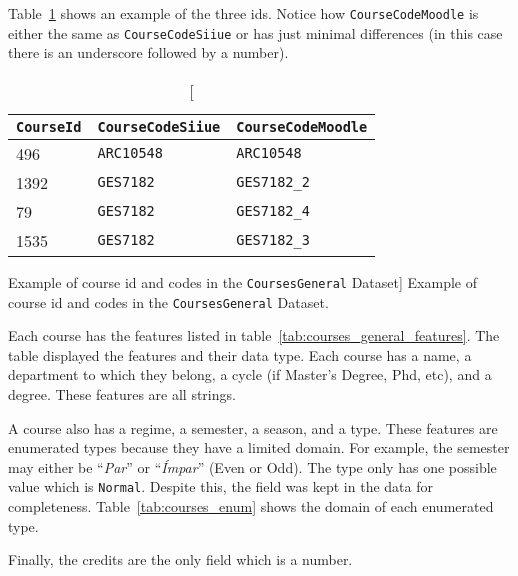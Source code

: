 Table~\ref{tab:course_code_example} shows an example of the three ids. Notice
how \texttt{CourseCodeMoodle} is either the same as \texttt{CourseCodeSiiue} or
has just minimal differences (in this case there is an underscore followed by a
number).

\begin{table}[h!]
    \centering

    \begin{tabular}{l l l}
\texttt{CourseId} & \texttt{CourseCodeSiiue} & \texttt{CourseCodeMoodle} \\ \hline
        496       & \texttt{ARC10548}        & \texttt{ARC10548}         \\
        1392      & \texttt{GES7182}         & \texttt{GES7182\_2}       \\
        79        & \texttt{GES7182}         & \texttt{GES7182\_4}       \\
        1535      & \texttt{GES7182}         & \texttt{GES7182\_3}       \\
    \end{tabular}

    \caption
        [Example of course id and codes in the \texttt{CoursesGeneral} Dataset]
        {Example of course id and codes in the \texttt{CoursesGeneral} Dataset.}

    \label{tab:course_code_example}
\end{table}

Each course has the features listed in
table~\ref{tab:courses_general_features}. The table displayed the features and
their data type. Each course has a name, a department to which they belong, a
cycle (if Master's Degree, Phd, etc), and a degree. These features are all
strings.

A course also has a regime, a semester, a season, and a type. These features
are enumerated types because they have a limited domain. For example, the
semester may either be ``\textit{Par}'' or ``\textit{Ímpar}'' (Even or Odd).
The type only has one possible value which is \texttt{Normal}. Despite this,
the field was kept in the data for completeness. Table~\ref{tab:courses_enum}
shows the domain of each enumerated type.

Finally, the credits are the only field which is a number.

